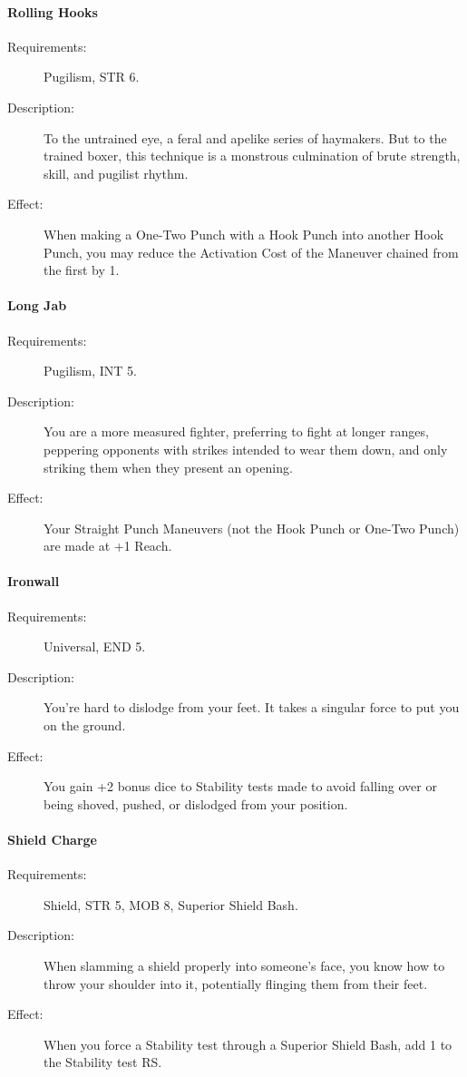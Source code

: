 \documentclass[oneside,11pt,english]{book}
\begin{document}
\paragraph{\label{talent:Rolling Hooks}Rolling Hooks}
\begin{description}
\item [Requirements:] Pugilism, STR 6. 
\item [Description:] To the untrained eye, a feral and apelike series of
  haymakers. But to the trained boxer, this technique is a monstrous culmination
  of brute strength, skill, and pugilist rhythm.  
\item [Effect:] When making a One-Two Punch with a Hook Punch into another Hook Punch, you may reduce the Activation Cost of the Maneuver chained from the first by 1. 
  
\end{description}
\paragraph{\label{talent:Long Jab}Long Jab}
\begin{description}
\item [Requirements:] Pugilism, INT 5. 
\item [Description:] You are a more measured fighter, preferring to fight at longer ranges, peppering opponents with strikes intended to wear them down, and only striking them when they present an opening. 
\item [Effect:] Your Straight Punch Maneuvers (not the Hook Punch or One-Two Punch) are made at +1 Reach.
  
\end{description}
\paragraph{\label{talent:Ironwall}Ironwall}
\begin{description}
\item [Requirements:] Universal, END 5. 
\item [Description:] You’re hard to dislodge from your feet. It takes a singular force to put you on the ground.
\item [Effect:] You gain +2 bonus dice to Stability tests made to avoid falling over or being shoved, pushed, or dislodged from your position. 
  
\end{description}
\paragraph{\label{talent:Shield Charge}Shield Charge}
\begin{description}
\item [Requirements:] Shield, STR 5, MOB 8, Superior Shield Bash. 
\item [Description:] When slamming a shield properly into someone’s face, you know how to throw your shoulder into it, potentially flinging them from their feet. 
\item [Effect:] When you force a Stability test through a Superior Shield Bash, add 1 to the Stability test RS. 
  
\end{description}
\end{document}
